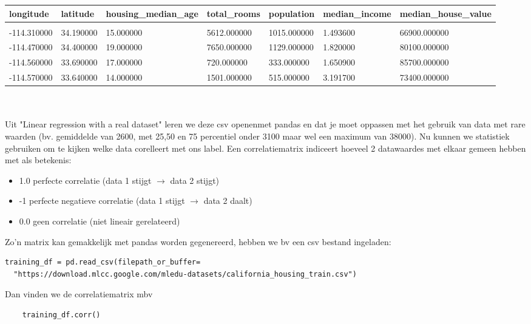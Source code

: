 \documentclass[10pt,a4paper,twoside]{article}
\begin{document}
\begin{table}[]
\begin{tabular}{lllllll}
longitude   & latitude  & housing\_median\_age & total\_rooms & population  & median\_income & median\_house\_value \\
\hline
\\
-114.310000 & 34.190000 & 15.000000            & 5612.000000  & 1015.000000 & 1.493600       & 66900.000000         \\
-114.470000 & 34.400000 & 19.000000            & 7650.000000  & 1129.000000 & 1.820000       & 80100.000000         \\
-114.560000 & 33.690000 & 17.000000            & 720.000000   & 333.000000  & 1.650900       & 85700.000000         \\
-114.570000 & 33.640000 & 14.000000            & 1501.000000  & 515.000000  & 3.191700       & 73400.000000        
\end{tabular}
\end{table}
\\\\
Uit "Linear regression with a real dataset" leren we deze csv openenmet pandas en dat je moet oppassen met het gebruik van data  met rare waarden (bv. gemiddelde van 2600, met 25,50 en 75 percentiel onder 3100 maar wel een maximum van 38000). Nu kunnen we statistiek gebruiken om te kijken welke data corelleert met ons label. Een correlatiematrix indiceert hoeveel 2 datawaardes met elkaar gemeen hebben met als betekenis:
\begin{itemize}
	\item 1.0 perfecte correlatie (data 1 stijgt $\rightarrow$ data 2 stijgt)
	\item -1 perfecte negatieve correlatie (data 1 stijgt $\rightarrow$ data 2 daalt)
	\item 0.0 geen correlatie (niet lineair gerelateerd)
\end{itemize}
Zo'n matrix kan gemakkelijk met pandas worden gegenereerd, hebben we bv een csv bestand ingeladen:
\begin{verbatim}
training_df = pd.read_csv(filepath_or_buffer=
  "https://download.mlcc.google.com/mledu-datasets/california_housing_train.csv")	
\end{verbatim}
Dan vinden we de correlatiematrix mbv
\begin{verbatim}
	training_df.corr()
\end{verbatim}
\newpage


\end{document}
